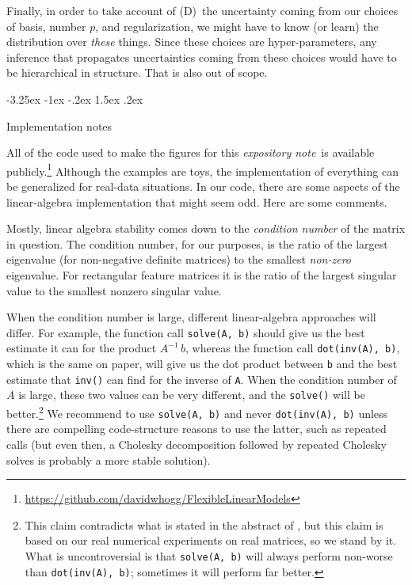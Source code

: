 \documentclass[12pt,letterpaper]{article}
\makeatletter
\renewcommand\section{\@startsection {section}{1}{\z@}%
  {-3.25ex \@plus -1ex \@minus -.2ex}%
  {1.5ex \@plus .2ex}%
  {\raggedright\normalfont\large\bfseries}}
\newcommand{\documentname}{\textsl{expository note}}
\newcommand{\code}[1]{\texttt{#1}}
\makeatother
\begin{document}
Finally, in order to take account of (D)~the uncertainty coming from our choices of basis, number $p$, and regularization, we might have to know (or learn) the distribution over \emph{these} things.
Since these choices are hyper-parameters, any inference that propagates uncertainties coming from these choices would have to be hierarchical in structure.
That is also out of scope.

\section{Implementation notes}\label{sec:implementation}

All of the code used to make the figures for this \documentname\ is available publicly.\footnote{\url{https://github.com/davidwhogg/FlexibleLinearModels}}
Although the examples are toys, the implementation of everything can be generalized for real-data situations.
In our code, there are some aspects of the linear-algebra implementation that might seem odd.
Here are some comments.

Mostly, linear algebra stability comes down to the \emph{condition number} of the matrix in question.
The condition number, for our purposes, is the ratio of the largest eigenvalue (for non-negative definite matrices) to the smallest \emph{non-zero} eigenvalue.
For rectangular feature matrices it is the ratio of the largest singular value to the smallest nonzero singular value.

When the condition number is large, different linear-algebra approaches will differ.
For example, the function call \code{solve(A, b)} should give us the best estimate it can for the product $A^{-1}\,b$, whereas the function call \code{dot(inv(A), b)}, which is the same on paper, will give us the dot product between \code{b} and the best estimate that \code{inv()} can find for the inverse of \code{A}.
When the condition number of $A$ is large, these two values can be very different, and the \code{solve()} will be better.\footnote{This claim contradicts what is stated in the abstract of \citet{solve}, but this claim is based on our real numerical experiments on real matrices, so we stand by it. What is uncontroversial is that \code{solve(A, b)} will always perform non-worse than \code{dot(inv(A), b)}; sometimes it will perform far better.}
We recommend to use \code{solve(A, b)} and never \code{dot(inv(A), b)} unless there are compelling code-structure reasons to use the latter, such as repeated calls (but even then, a Cholesky decomposition followed by repeated Cholesky solves is probably a more stable solution).
\end{document}
